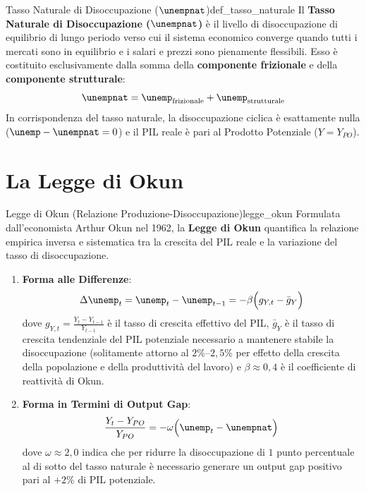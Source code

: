 \begin{definizione}{Tasso Naturale di Disoccupazione ($\unempnat$)}{def_tasso_naturale}
Il \textbf{Tasso Naturale di Disoccupazione ($\unempnat$)} è il livello di disoccupazione di equilibrio di lungo periodo verso cui il sistema economico converge quando tutti i mercati sono in equilibrio e i salari e prezzi sono pienamente flessibili.
Esso è costituito esclusivamente dalla somma della \textbf{componente frizionale} e della \textbf{componente strutturale}:
\begin{equation}
    \unempnat = \unemp_{\text{frizionale}} + \unemp_{\text{strutturale}}
\end{equation}
In corrispondenza del tasso naturale, la disoccupazione ciclica è esattamente nulla ($\unemp - \unempnat = 0$) e il PIL reale è pari al Prodotto Potenziale ($Y = Y_{PO}$).
\end{definizione}

\section{La Legge di Okun}

\begin{legge}{Legge di Okun (Relazione Produzione-Disoccupazione)}{legge_okun}
Formulata dall'economista Arthur Okun nel 1962, la \textbf{Legge di Okun} quantifica la relazione empirica inversa e sistematica tra la crescita del PIL reale e la variazione del tasso di disoccupazione.
\begin{enumerate}
    \item \textbf{Forma alle Differenze}:
    \begin{equation}
        \Delta \unemp_t = \unemp_t - \unemp_{t-1} = -\beta \Big( g_{Y, t} - \bar{g}_Y \Big) \label{eq:okun_diff}
    \end{equation}
    dove $g_{Y, t} = \frac{Y_t - Y_{t-1}}{Y_{t-1}}$ è il tasso di crescita effettivo del PIL, $\bar{g}_Y$ è il tasso di crescita tendenziale del PIL potenziale necessario a mantenere stabile la disoccupazione (solitamente attorno al $2$\%--$2{,}5$\% per effetto della crescita della popolazione e della produttività del lavoro) e $\beta \approx 0{,}4$ è il coefficiente di reattività di Okun.
    \item \textbf{Forma in Termini di Output Gap}:
    \begin{equation}
        \frac{Y_t - Y_{PO}}{Y_{PO}} = -\omega \Big( \unemp_t - \unempnat \Big) \label{eq:okun_gap}
    \end{equation}
    dove $\omega \approx 2{,}0$ indica che per ridurre la disoccupazione di $1$ punto percentuale al di sotto del tasso naturale è necessario generare un output gap positivo pari al $+2$\% di PIL potenziale.
\end{enumerate}
\end{legge}

